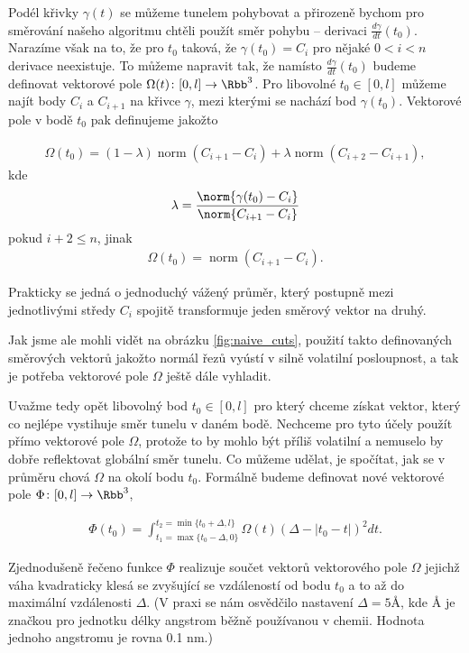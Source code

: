 Podél křivky $ \gamma(t) $ se můžeme tunelem pohybovat a přirozeně bychom pro
směrování našeho algoritmu chtěli použít směr pohybu – derivaci
$ \frac{d\gamma}{dt}(t_0) $. Narazíme však na to, že pro $ t_0 $ taková, že
$ \gamma(t_0) = C_i $ pro nějaké $ 0 < i < n $ derivace neexistuje. To můžeme
napravit tak, že namísto $ \frac{d\gamma}{dt}(t_0) $ budeme definovat vektorové
pole $ \Omega(t) \colon [0, l] \to \Rbb^3 $. Pro libovolné $ t_0 \in [0, l] $
můžeme najít body $ C_i $ a $ C_{i + 1} $ na křivce $ \gamma $, mezi kterými
se nachází bod $ \gamma(t_0) $. Vektorové pole v bodě $ t_0 $ pak definujeme
jakožto

\begin{align}
    \Omega(t_0) =
            (1 - \lambda) \operatorname{norm}(C_{i + 1} - C_i)
            +
            \lambda \operatorname{norm}(C_{i + 2} - C_{i + 1})
        ,
\end{align}
kde
\begin{align}
    \lambda = \frac{\norm{\gamma(t_0) - C_i}}{\norm{C_{i + 1} - C_i}}
\end{align}
pokud $ i + 2 \leq n $, jinak
\begin{align}
    \Omega(t_0) = \operatorname{norm}(C_{i + 1} - C_i).
\end{align}

Prakticky se jedná o jednoduchý vážený průměr, který postupně mezi jednotlivými středy
$ C_i $ spojitě transformuje jeden směrový vektor na druhý.

Jak jsme ale mohli vidět na obrázku \ref{fig:naive_cuts}, použití takto definovaných
směrových vektorů jakožto normál řezů vyústí v silně volatilní posloupnost,
a tak je potřeba vektorové pole $ \Omega $ ještě dále vyhladit.

Uvažme tedy opět libovolný bod $ t_0 \in [0, l] $ pro který chceme získat vektor,
který co nejlépe vystihuje směr tunelu v daném bodě. Nechceme pro tyto účely použít
přímo vektorové pole $ \Omega $, protože to by mohlo být příliš volatilní
a nemuselo by dobře reflektovat globální směr tunelu. Co můžeme udělat, je spočítat,
jak se v průměru chová $ \Omega $ na okolí bodu $ t_0 $. Formálně budeme
definovat nové vektorové pole $ \Phi \colon [0, l] \to \Rbb^3 $,

\begin{align}
    \Phi(t_0) = \int_{t_1 = \max\{t_0 - \Delta, 0\}}^{t_2 = \min\{t_0 + \Delta, l\}}
        \Omega(t) (\Delta - \left| t_0 - t \right| )^2 dt.
\end{align}

Zjednodušeně řečeno funkce $ \Phi $ realizuje součet vektorů vektorového pole
$ \Omega $ jejichž váha kvadraticky klesá se zvyšující se vzdáleností od bodu
$ t_0 $ a to až do maximální vzdálenosti $ \Delta $. (V praxi se nám osvědčilo
nastavení $ \Delta = 5 Å $, kde Å je značkou pro jednotku délky angstrom běžně
používanou v chemii. Hodnota jednoho angstromu je rovna 0.1 nm.)

